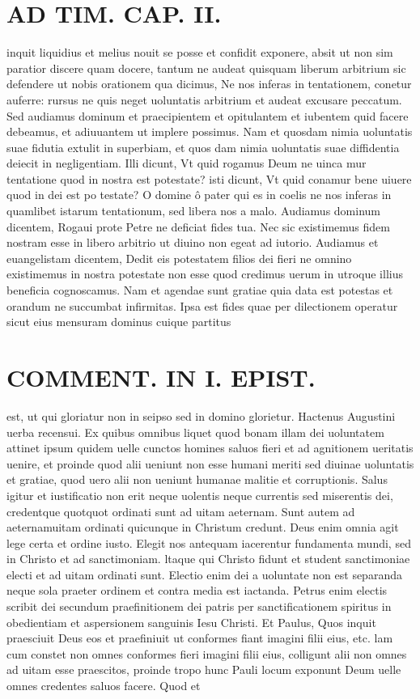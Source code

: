 \documentclass{article}
\begin{document}
\begin{pages}
\section*{AD TIM. CAP. II. }
\marginpar{[ p.115 ]}\pstart inquit liquidius et melius nouit se posse et confidit exponere, absit ut non sim paratior discere quam docere, tantum ne audeat quisquam liberum arbitrium sic defendere ut nobis orationem qua dicimus, Ne nos inferas in tentationem, conetur auferre: rursus ne quis neget uoluntatis arbitrium et audeat excusare peccatum. Sed audiamus dominum et praecipientem et opitulantem et iubentem quid facere debeamus, et adiuuantem ut implere possimus. Nam et quosdam nimia uoluntatis suae fidutia extulit in superbiam, et quos dam nimia uoluntatis suae diffidentia deiecit in negligentiam. Illi dicunt, Vt quid rogamus Deum ne uinca mur tentatione quod in nostra est potestate? isti dicunt, Vt quid conamur bene uiuere quod in dei est po testate? O domine ô pater qui es in coelis ne nos inferas in quamlibet istarum tentationum, sed libera nos a malo. Audiamus dominum dicentem, Rogaui prote Petre ne deficiat fides tua. Nec sic existimemus fidem nostram esse in libero arbitrio ut diuino non egeat ad iutorio. Audiamus et euangelistam dicentem, Dedit eis potestatem filios dei fieri ne omnino existimemus in nostra potestate non esse quod credimus uerum in utroque illius beneficia cognoscamus. Nam et agendae sunt gratiae quia data est potestas et orandum ne succumbat infirmitas. Ipsa est fides quae per dilectionem operatur sicut eius mensuram dominus cuique partitus  \pend
\section*{COMMENT. IN I. EPIST. }\pstart est, ut qui gloriatur non in seipso sed in domino glorietur. Hactenus Augustini uerba recensui. Ex quibus omnibus liquet quod bonam illam dei uoluntatem attinet ipsum quidem uelle cunctos homines saluos fieri et ad agnitionem ueritatis uenire, et proinde quod alii ueniunt non esse humani meriti sed diuinae uoluntatis et gratiae, quod uero alii non ueniunt humanae malitie et corruptionis. Salus igitur et iustificatio non erit neque uolentis neque currentis sed miserentis dei, credentque quotquot ordinati sunt ad uitam aeternam. Sunt autem ad aeternamuitam ordinati quicunque in Christum credunt. Deus enim omnia agit lege certa et ordine iusto. Elegit nos antequam iacerentur fundamenta mundi, sed in Christo et ad sanctimoniam. ltaque  qui Christo fidunt et student sanctimoniae electi et ad uitam ordinati sunt. Electio enim dei a uoluntate non est separanda neque sola praeter ordinem et contra media est iactanda. Petrus enim electis scribit dei secundum praefinitionem dei patris per sanctificationem spiritus in obedientiam et aspersionem sanguinis Iesu Christi. Et Paulus, Quos inquit praesciuit Deus eos et praefiniuit ut conformes fiant imagini filii eius, etc. lam cum constet non omnes conformes fieri imagini filii eius, colligunt alii non omnes ad uitam esse praescitos, proinde tropo hunc Pauli locum exponunt Deum uelle omnes credentes saluos facere. Quod et  \pend

\end{pages}
\end{document}
